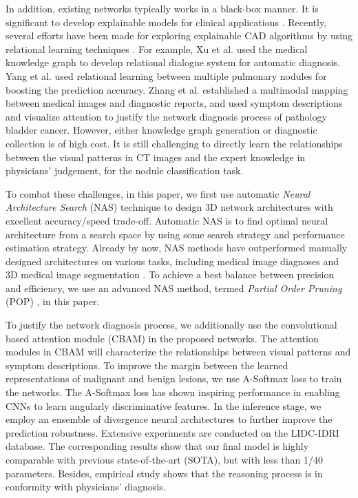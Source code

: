 \documentclass[final,5p,times,twocolumn]{elsarticle}
\begin{document}
In addition, existing networks typically works in a black-box manner. It is significant to develop explainable models for clinical applications \cite{tjoa2020XAImedical}. 
Recently, several efforts have been made for exploring explainable CAD algorithms by using relational learning techniques \cite{jing2020relational}. For example, Xu et al. \cite{xu2019end} used the medical knowledge graph to develop relational dialogue system for automatic diagnosis. Yang et al. \cite{yang2020relational} used relational learning between multiple pulmonary nodules for boosting the prediction accuracy. Zhang et al. \cite{zhang2017mdnet} established a multimodal mapping between medical images and diagnostic reports, and used symptom descriptions and visualize attention to justify the network diagnosis process of pathology bladder cancer. However, either knowledge graph generation or diagnostic collection is of high cost. It is still challenging to directly learn the relationships between the visual patterns in CT images and the expert knowledge in physicians' judgement, for the nodule classification task. 

To combat these challenges, in this paper, we first use automatic \emph{Neural Architecture Search} (NAS) technique \citep{NAS2019JMLR} to design 3D network architectures with excellent accuracy/speed trade-off. 
 Automatic NAS is to find optimal neural architecture from a search space by using some search strategy and performance estimation strategy. Already by now, NAS methods have outperformed manually designed architectures on various tasks, including medical image diagnoses \cite{FAES2019AutoDLmedical} and 3D medical image segmentation \cite{kim2019scalable, weng2019nasunet}. To achieve a best balance between precision and efficiency, we use an advanced NAS method, termed \emph{Partial Order Pruning} (POP) \citep{li2019partial}, in this paper. 

To justify the network diagnosis process, we additionally use the convolutional based attention module (CBAM) \citep{Woo2018CBAM} in the proposed networks. The attention modules in CBAM will characterize the relationships between visual patterns and symptom descriptions.
To improve the margin between the learned representations of malignant and benign lesions, we use A-Softmax loss \citep{Liu2017SphereFace} to train the networks. The A-Softmax loss has shown inspiring performance in enabling CNNs to learn angularly discriminative features.
In the inference stage, we employ an ensemble of divergence neural architectures to further improve the prediction robustness.
Extensive experiments are conducted on the LIDC-IDRI database. The corresponding results show that our final model is highly comparable with previous state-of-the-art (SOTA), but with less than 1/40 parameters. Besides, empirical study shows that the reasoning process is in conformity with physicians' diagnosis. 
\end{document}
